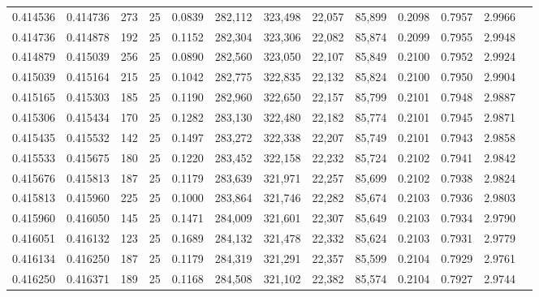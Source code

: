 \begin{tabular}{rrrrrrrrrrrrr}
0.414536 & 0.414736 &   273 &  25 &                                     0.0839 & 282,112 & 323,498 &  22,057 &  85,899 & 0.2098 & 0.7957 & 2.9966 \\
0.414736 & 0.414878 &   192 &  25 &                                     0.1152 & 282,304 & 323,306 &  22,082 &  85,874 & 0.2099 & 0.7955 & 2.9948 \\
0.414879 & 0.415039 &   256 &  25 &                                     0.0890 & 282,560 & 323,050 &  22,107 &  85,849 & 0.2100 & 0.7952 & 2.9924 \\
0.415039 & 0.415164 &   215 &  25 &                                     0.1042 & 282,775 & 322,835 &  22,132 &  85,824 & 0.2100 & 0.7950 & 2.9904 \\
0.415165 & 0.415303 &   185 &  25 &                                     0.1190 & 282,960 & 322,650 &  22,157 &  85,799 & 0.2101 & 0.7948 & 2.9887 \\
0.415306 & 0.415434 &   170 &  25 &                                     0.1282 & 283,130 & 322,480 &  22,182 &  85,774 & 0.2101 & 0.7945 & 2.9871 \\
0.415435 & 0.415532 &   142 &  25 &                                     0.1497 & 283,272 & 322,338 &  22,207 &  85,749 & 0.2101 & 0.7943 & 2.9858 \\
0.415533 & 0.415675 &   180 &  25 &                                     0.1220 & 283,452 & 322,158 &  22,232 &  85,724 & 0.2102 & 0.7941 & 2.9842 \\
0.415676 & 0.415813 &   187 &  25 &                                     0.1179 & 283,639 & 321,971 &  22,257 &  85,699 & 0.2102 & 0.7938 & 2.9824 \\
0.415813 & 0.415960 &   225 &  25 &                                     0.1000 & 283,864 & 321,746 &  22,282 &  85,674 & 0.2103 & 0.7936 & 2.9803 \\
0.415960 & 0.416050 &   145 &  25 &                                     0.1471 & 284,009 & 321,601 &  22,307 &  85,649 & 0.2103 & 0.7934 & 2.9790 \\
0.416051 & 0.416132 &   123 &  25 &                                     0.1689 & 284,132 & 321,478 &  22,332 &  85,624 & 0.2103 & 0.7931 & 2.9779 \\
0.416134 & 0.416250 &   187 &  25 &                                     0.1179 & 284,319 & 321,291 &  22,357 &  85,599 & 0.2104 & 0.7929 & 2.9761 \\
0.416250 & 0.416371 &   189 &  25 &                                     0.1168 & 284,508 & 321,102 &  22,382 &  85,574 & 0.2104 & 0.7927 & 2.9744 \\

\end{tabular}
